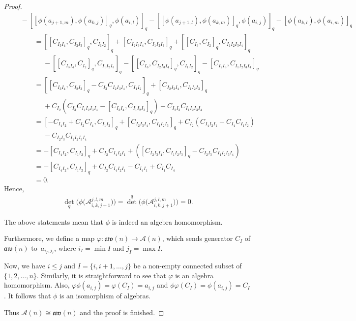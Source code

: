 \documentclass[10pt,a4paper]{amsart}
\numberwithin{equation}{section}
\def\lrb#1{\left(#1\right)}
\def\A{\mathscr{A}}
\def\aw{\mathfrak{aw}}
\begin{document}
\begin{proof}
\begin{gather*}
 \qquad {}- [ [ \phi(a_{j+1, m}), \phi(a_{k, j}) ]_q, \phi(a_{i, l}) ]_q - [ [\phi(a_{j+1, l}), \phi(a_{k, m}) ]_q, \phi(a_{i, j}) ]_q- [\phi(a_{k, l}), \phi(a_{i, m}) ]_q\\
 \phantom{\qquad\qquad}{} = [ [C_{I_3I_4}, C_{I_2I_3} ]_q, C_{I_1I_2} ]_q+ [C_{I_2I_3I_4}, C_{I_1I_2I_3} ]_q + [ [C_{I_3}, C_{I_2} ]_q, C_{I_1I_2I_3I_4} ]_q \\
 \phantom{\qquad\qquad=}{} - [ [ C_{I_3I_4}, C_{I_2} ]_q, C_{I_1I_2I_3} ]_q - [ [C_{I_3}, C_{I_2I_3I_4} ]_q, C_{I_1I_2} ]_q- [C_{I_2I_3}, C_{I_1I_2I_3I_4} ]_q\\
 \phantom{\qquad\qquad}{} = [ [C_{I_3I_4}, C_{I_2I_3} ]_q-C_{I_3} C_{I_2I_3I_4}, C_{I_1I_2} ]_q+ [C_{I_2I_3I_4}, C_{I_1I_2I_3} ]_q \\
 \phantom{\qquad\qquad=}{} +C_{I_2}\lrb{C_{I_3}C_{I_1I_2I_3I_4}- [ C_{I_3I_4}, C_{I_1I_2I_3} ]_q }-C_{I_2I_3} C_{I_1I_2I_3I_4}\\
 \phantom{\qquad\qquad}{} = [-C_{I_4I_2}+C_{I_2} C_{I_4}, C_{I_1I_2} ]_q+ [C_{I_2I_3I_4}, C_{I_1I_2I_3} ]_q +C_{I_2}\lrb{C_{I_4I_2I_1}-C_{I_4}C_{I_1I_2}}\\
 \phantom{\qquad\qquad=}{} -C_{I_2I_3} C_{I_1I_2I_3I_4}\\
 \phantom{\qquad\qquad}{} = - [C_{I_4I_2}, C_{I_1I_2} ]_q +C_{I_2}C_{I_4I_2I_1}+ \lrb{ [C_{I_2I_3I_4}, C_{I_1I_2I_3} ]_q -C_{I_2I_3} C_{I_1I_2I_3I_4}}\\
 \phantom{\qquad\qquad}{} = - [C_{I_4I_2}, C_{I_1I_2} ]_q +C_{I_2}C_{I_4I_2I_1}- C_{I_4I_1}+C_{I_1}C_{I_4}\\
 \phantom{\qquad\qquad}{} = 0.
 \end{gather*}
Hence,
\begin{gather*}
{\det}_q\bigl(\phi\bigl(\A_{i,k,j+1}^{j,l,m}\bigr)\bigr)={\det}^q\bigl(\phi\bigl(\A_{i,k,j+1}^{j,l,m}\bigr)\bigr)=0.
\end{gather*}

The above statements mean that $\phi$ is indeed an algebra homomorphism.

Furthermore, we define a map $\varphi\colon \aw(n) \rightarrow \A(n)$, which sends generator $C_I$ of $\aw(n)$ to~$a_{i_I, j_I}$, where $i_I=\min I$ and $j_I=\max I$.

Now, we have $i \leq j$ and $I=\{i, i+1, \dots, j\}$ be a non-empty connected subset of $\{1, 2, \dots, n\}$.
Similarly, it is straightforward to see that $\varphi$ is an algebra homomorphism.
Also, $\varphi \phi\lrb{a_{i, j}}=\varphi\lrb{C_I}=a_{i, j}$ and $\phi \varphi \lrb{C_I}=\phi\lrb{a_{i, j}}=C_I$.
It follows that $\phi$ is an isomorphism of algebras.

Thus $\A(n) \cong \aw(n)$
and the proof is finished.
\end{proof}
\end{document}
